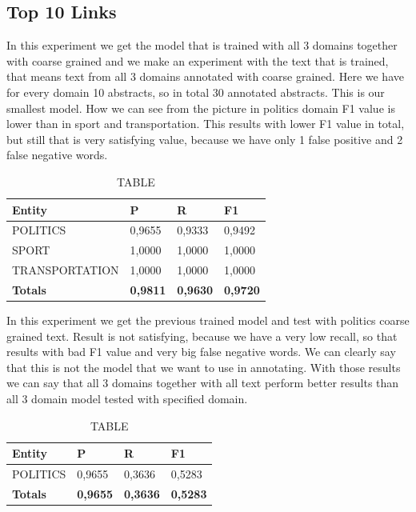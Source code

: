 \documentclass[thesis=M,english]{FITthesis}[2018/05/30]
\begin{document}
\subsection{Top 10 Links}\label{subsec:Top10}
	In this experiment we get the model that is trained with all 3 domains together with coarse grained and we make an experiment with the text that is trained, that means text from all 3 domains annotated with coarse grained. 
	Here we have for every domain 10 abstracts, so in total 30 annotated abstracts. This is our smallest model.
	How we can see from the picture in politics domain F1 value is lower than in sport and transportation. This results with lower F1 value in total, but still that is very satisfying value, because we have only 1 false positive and 2 false negative words.  
	\begin{table}[H]\centering
		\caption{TABLE}
		\label{}
		\begin{tabular}{|l|l|l|l|}
			\hline {\textbf{Entity}} & {\textbf{P}} & {\textbf{R}} & {\textbf{F1}}\\\hline
				POLITICS & 0,9655 & 0,9333 & 0,9492\\
				SPORT & 1,0000 & 1,0000 & 1,0000\\
				TRANSPORTATION & 1,0000 & 1,0000 & 1,0000\\\hline
				\textbf{Totals} & \textbf{0,9811} & \textbf{0,9630} & \textbf{0,9720}\\\hline
		\end{tabular}
	\end{table}

	In this experiment we get the previous trained model and test with politics coarse grained text. Result is not satisfying, because we have a very low recall, so that results with bad F1 value and very big false negative words. We can clearly say that this is not the model that we want to use in annotating. With those results we can say that all 3 domains together with all text perform better results than all 3 domain model tested with specified domain.  

	\begin{table}[H]\centering
		\caption{TABLE}
		\label{}
		\begin{tabular}{|l|l|l|l|}
			\hline {\textbf{Entity}} & {\textbf{P}} & {\textbf{R}} & {\textbf{F1}}\\\hline
				POLITICS & 0,9655 & 0,3636 & 0,5283\\\hline
				\textbf{Totals} & \textbf{0,9655} & \textbf{0,3636} & \textbf{0,5283}\\\hline
		\end{tabular}
	\end{table}
\end{document}
